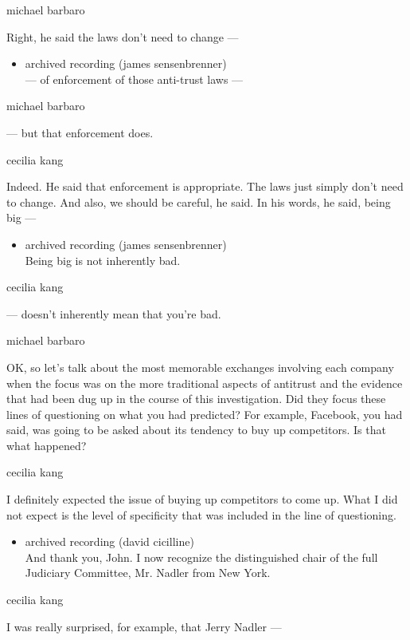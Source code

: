 michael barbaro

Right, he said the laws don't need to change ---

\begin{itemize}
\tightlist
\item
  archived recording (james sensenbrenner)\\
  --- of enforcement of those anti-trust laws ---
\end{itemize}

michael barbaro

--- but that enforcement does.

cecilia kang

Indeed. He said that enforcement is appropriate. The laws just simply
don't need to change. And also, we should be careful, he said. In his
words, he said, being big ---

\begin{itemize}
\tightlist
\item
  archived recording (james sensenbrenner)\\
  Being big is not inherently bad.
\end{itemize}

cecilia kang

--- doesn't inherently mean that you're bad.

michael barbaro

OK, so let's talk about the most memorable exchanges involving each
company when the focus was on the more traditional aspects of antitrust
and the evidence that had been dug up in the course of this
investigation. Did they focus these lines of questioning on what you had
predicted? For example, Facebook, you had said, was going to be asked
about its tendency to buy up competitors. Is that what happened?

cecilia kang

I definitely expected the issue of buying up competitors to come up.
What I did not expect is the level of specificity that was included in
the line of questioning.

\begin{itemize}
\tightlist
\item
  archived recording (david cicilline)\\
  And thank you, John. I now recognize the distinguished chair of the
  full Judiciary Committee, Mr. Nadler from New York.
\end{itemize}

cecilia kang

I was really surprised, for example, that Jerry Nadler ---

